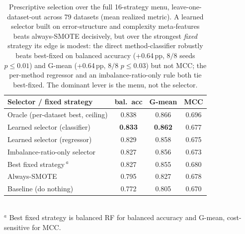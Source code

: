 \begin{table}[t]
\centering
\caption{Prescriptive selection over the full 16-strategy menu, leave-one-dataset-out
across 79 datasets (mean realized metric). A learned selector built on error-structure
and complexity meta-features beats always-SMOTE decisively, but over the strongest
\emph{fixed} strategy its edge is modest: the direct method-classifier robustly beats
best-fixed on balanced accuracy (+0.64\,pp, $8/8$ seeds $p{\le}0.01$) and G-mean
(+0.64\,pp, $8/8$ $p{\le}0.03$) but not MCC; the per-method regressor and an
imbalance-ratio-only rule both tie best-fixed. The dominant lever is the menu, not the
selector.}
\label{tab:selection}
\small
\begin{tabular}{l ccc}
\toprule
Selector / fixed strategy & bal.\ acc & G-mean & MCC \\
\midrule
Oracle (per-dataset best, ceiling)        & 0.838 & 0.866 & 0.696 \\
\midrule
Learned selector (classifier)             & \textbf{0.833} & \textbf{0.862} & 0.677 \\
Learned selector (regressor)              & 0.829 & 0.858 & 0.675 \\
Imbalance-ratio-only selector             & 0.827 & 0.856 & 0.673 \\
\midrule
Best fixed strategy\,$^{a}$               & 0.827 & 0.855 & 0.680 \\
Always-SMOTE                              & 0.795 & 0.827 & 0.678 \\
Baseline (do nothing)                     & 0.772 & 0.805 & 0.670 \\
\bottomrule
\end{tabular}\\[2pt]
{\footnotesize $^{a}$ Best fixed strategy is balanced RF for balanced accuracy and
G-mean, cost-sensitive for MCC.}
\end{table}
